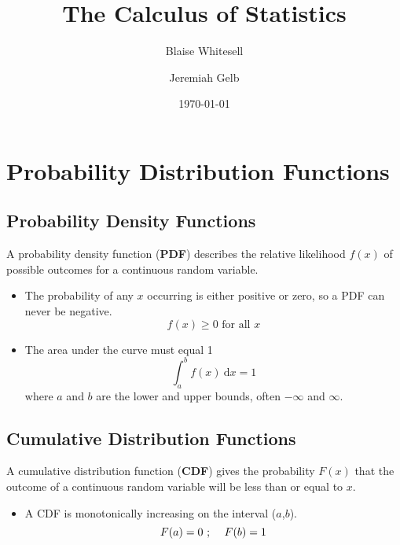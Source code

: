 \documentclass[12pt,letterpaper]{article}
\title{The Calculus of Statistics%
}
\author{Blaise Whitesell \and Jeremiah Gelb}
\date{\today}
\begin{document}
\newcommand{\bdef}[1]{\textbf{#1}} %
\newcommand{\dx}{\:\mathrm{d}x} %
\maketitle
\section{Probability Distribution Functions}
\subsection{Probability Density Functions}
A probability density function (\bdef{PDF}) describes the relative likelihood $f(x)$ of possible outcomes for a continuous random variable.
\begin{itemize}
\item The probability of any $x$ occurring is either positive or zero, so a PDF can never be negative.
\begin{equation*}
f(x) \geq 0 \text{ for all }x
\end{equation*}
\item The area under the curve must equal 1
\begin{equation*}
\int_a^b f(x)\dx = 1
\end{equation*}
where $a$ and $b$ are the lower and upper bounds, often $-\infty$ and $\infty$.
\end{itemize}
\subsection{Cumulative Distribution Functions}
A cumulative distribution function (\bdef{CDF}) gives the probability $F(x)$ that the outcome of a continuous random variable will be less than or equal to $x$.
\begin{itemize}
\item A CDF is monotonically increasing on the interval ($a$,$b$).
\begin{equation*}
F(a) = 0 \text{ ; \quad}F(b) = 1
\end{equation*}
\end{itemize}
\end{document}
